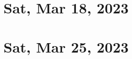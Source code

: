 \documentclass[a4paper]{report}
\institute{Institute Name}
\date{Based on lectures by \profloc{} in 2023
\\~\\ Draft updated on \today}
\begin{document}
\maketitle
{}

\newpage
\pagestyle{plain}
\setcounter{tocdepth}{0}
\tableofcontents
\newpage
\pagestyle{head}

\chapter{Sat, Mar 18, 2023}

\chapter{Sat, Mar 25, 2023}



\end{document}
